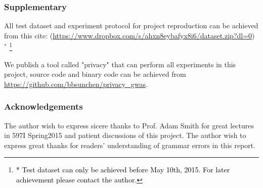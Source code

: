 \documentclass[12pt, singlespace]{article}
\newcommand{\cnote}[1]{\footnote{\textcolor{black}{#1}}}
\begin{document}
\subsubsection*{Supplementary}
 All test dataset and experiment protocol for project reproduction can be achieved from this cite: (\url{https://www.dropbox.com/s/ahxn8eybafyx8i6/dataset.zip?dl=0}) $^*$ \cnote{* Test dataset can only be achieved before May 10th, 2015. For later achievement please contact the author.}
 
 We publish a tool called "privacy" that can perform all experiments in this project, source code and binary code can be achieved from \url{https://github.com/bbsunchen/privacy_gwas}.

\subsubsection*{Acknowledgements}

The author wish to express sicere thanks to Prof. Adam Smith for great lectures in 597I Spring2015 and patient discussions of this project. The author wish to express great thanks for readers' understanding of grammar errors in this report.
    



\end{document}
